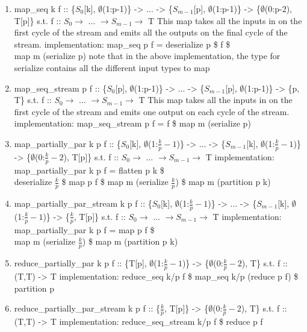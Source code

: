 \documentclass[11pt,fleqn]{article}
\numberwithin{equation}{subsection}
\begin{document}
\begin{enumerate}
    \item map\_seq k f :: \{$S_0$[k], $\emptyset$(1:p-1)\} -> ...
        -> \{$S_{m-1}$[p], $\emptyset$(1:p-1)\} ->
        \{$\emptyset$(0:p-2), T[p]\}
        \subitem s.t. f :: $S_0 \rightarrow$ ... $\rightarrow S_{m-1} \rightarrow$ T
        \subitem This map takes all the inputs in on the first cycle of the 
        stream and emits all the outputs on the final cycle of the stream.
        \subitem implementation: map\_seq p f = deserialize p \$ f \$ \\ map m (serialize p)
        \subitem note that in the above implementation, the type for serialize 
        contains all the different input types to map
    \item map\_seq\_stream p f :: \{$S_0$[p], $\emptyset$(1:p-1)\} -> ...
        -> \{$S_{m-1}$[p], $\emptyset$(1:p-1)\} ->
        \{p, T\}
        \subitem s.t. f :: $S_0 \rightarrow$ ... $\rightarrow S_{m-1} \rightarrow$ T
        \subitem This map takes all the inputs in on the first cycle of the 
        stream and emits one output on each cycle of the stream.
        \subitem implementation: map\_seq\_stream p f = f \$ map m (serialize p)
    \item map\_partially\_par k p f :: \{$S_0$[k], $\emptyset$(1:$\frac{k}{p}-1$)\} 
        -> ... -> 
        \{$S_{m-1}$[k], $\emptyset$(1:$\frac{k}{p}-1$)\} ->
        \{$\emptyset$(0:$\frac{k}{p}-2$), T[p]\}
        \subitem s.t. f :: $S_0 \rightarrow$ ... $\rightarrow S_{m-1} \rightarrow$ T
        \subitem implementation: map\_partially\_par k p f = flatten p k \$ \\ 
        deserialize $\frac{k}{p}$ \$ map p f \$ map m (serialize $\frac{k}{p}$) \$ map m (partition p k)
    \item map\_partially\_par\_stream k p f :: \{$S_0$[k], $\emptyset$(1:$\frac{k}{p}-1$)\} 
        -> ... -> 
        \{$S_{m-1}$[k], $\emptyset$(1:$\frac{k}{p}-1$)\} ->
        \{$\frac{k}{p}$, T[p]\}
        \subitem s.t. f :: $S_0 \rightarrow$ ... $\rightarrow S_{m-1} \rightarrow$ T
        \subitem implementation: map\_partially\_par k p f = map p f \$ \\ 
        map m (serialize $\frac{k}{p}$) \$ map m (partition p k)
    \item reduce\_partially\_par k p f :: \{T[p], $\emptyset$(1:$\frac{k}{p}-1$)\} 
        -> \{$\emptyset$(0:$\frac{k}{p}-2$), T\}
        \subitem s.t. f :: (T,T) -> T
        \subitem implementation: reduce\_seq k/p f \$ map\_seq k/p (reduce p f) 
        \$ partition p
    \item reduce\_partially\_par\_stream k p f :: \{$\frac{k}{p}$, T[p]\}
        -> \{$\emptyset$(0:$\frac{k}{p}-2$), T\}
        \subitem s.t. f :: (T,T) -> T
        \subitem implementation: reduce\_seq\_stream k/p f \$ reduce p f
\end{enumerate}
\end{document}
